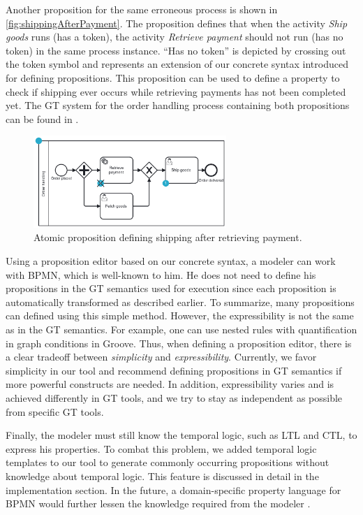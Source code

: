 \documentclass{lmcs} %
\begin{document}
Another proposition for the same erroneous process is shown in \autoref{fig:shippingAfterPayment}.
The proposition defines that when the activity \textit{Ship goods} runs (has a token), the activity \textit{Retrieve payment} should not run (has no token) in the same process instance.
\enquote{Has no token} is depicted by crossing out the token symbol and represents an extension of our concrete syntax introduced for defining propositions.
This proposition can be used to define a property to check if shipping ever occurs while retrieving payments has not been completed yet.
The GT system for the order handling process containing both propositions can be found in \cite{timkrauterLMCS2024Artifacts2023}.

\begin{figure}[ht]
    \centering
    \includegraphics[width=0.65\textwidth]{images/shippingAfterPayment.pdf}
    \caption{Atomic proposition defining shipping after retrieving payment.}
    \label{fig:shippingAfterPayment}
\end{figure}

Using a proposition editor based on our concrete syntax, a modeler can work with BPMN, which is well-known to him.
He does not need to define his propositions in the GT semantics used for execution since each proposition is automatically transformed as described earlier.
To summarize, many propositions can defined using this simple method.
However, the expressibility is not the same as in the GT semantics.
For example, one can use nested rules with quantification in graph conditions in Groove.
Thus, when defining a proposition editor, there is a clear tradeoff between \textit{simplicity} and \textit{expressibility}.
Currently, we favor simplicity in our tool and recommend defining propositions in GT semantics if more powerful constructs are needed.
In addition, expressibility varies and is achieved differently in GT tools, and we try to stay as independent as possible from specific GT tools.

Finally, the modeler must still know the temporal logic, such as LTL and CTL, to express his properties.
To combat this problem, we added temporal logic templates to our tool to generate commonly occurring propositions without knowledge about temporal logic.
This feature is discussed in detail in the implementation section.
In the future, a domain-specific property language for BPMN would further lessen the knowledge required from the modeler \cite{meyersProMoBoxFrameworkGenerating2014}.
\end{document}
